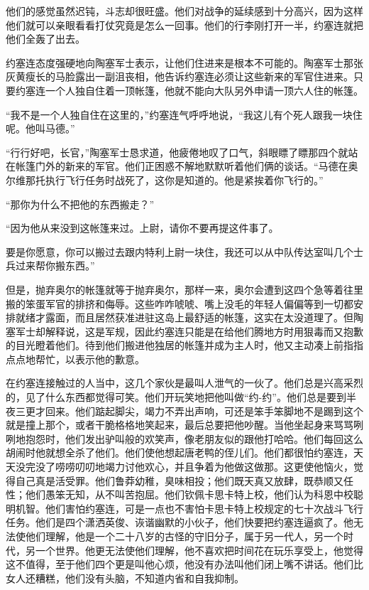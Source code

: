  


    他们的感觉虽然迟钝，斗志却很旺盛。他们对战争的延续感到十分高兴，因为这样他们就可以亲眼看看打仗究竟是怎么一回事。他们的行李刚打开一半，约塞连就把他们全轰了出去。

    约塞连态度强硬地向陶塞军士表示，让他们住进来是根本不可能的。陶塞军士那张灰黄瘦长的马脸露出一副沮丧相，他告诉约塞连必须让这些新来的军官住进来。只要约塞连一个人独自住着一顶帐篷，他就不能向大队另外申请一顶六人住的帐篷。

    “我不是一个人独自住在这里的，”约塞连气呼呼地说，“我这儿有个死人跟我一块住呢。他叫马德。”

    “行行好吧，长官，”陶塞军士恳求道，他疲倦地叹了口气，斜眼瞟了瞟那四个就站在帐篷门外的新来的军官。他们正困惑不解地默默听着他们俩的谈话。“马德在奥尔维那托执行飞行任务时战死了，这你是知道的。他是紧挨着你飞行的。”

    “那你为什么不把他的东西搬走？”

    “因为他从来没到这帐篷来过。上尉，请你不要再提这件事了。

    要是你愿意，你可以搬过去跟内特利上尉一块住，我还可以从中队传达室叫几个士兵过来帮你搬东西。”

    但是，抛弃奥尔的帐篷就等于抛弃奥尔，那样一来，奥尔会遭到这四个急等着往里搬的笨蛋军官的排挤和侮辱。这些咋咋唬唬、嘴上没毛的年轻人偏偏等到一切都安排就绪才露面，而且居然获准进驻这岛上最舒适的帐篷，这实在太没道理了。但陶塞军士却解释说，这是军规，因此约塞连只能是在给他们腾地方时用狠毒而又抱歉的目光瞪着他们。待到他们搬进他独居的帐篷并成为主人时，他又主动凑上前指指点点地帮忙，以表示他的歉意。

    在约塞连接触过的人当中，这几个家伙是最叫人泄气的一伙了。他们总是兴高采烈的，见了什么东西都觉得可笑。他们开玩笑地把他叫做“约-约”。他们总是要到半夜三更才回来。他们踮起脚尖，竭力不弄出声响，可还是笨手笨脚地不是踢到这个就是撞上那个，或者干脆格格地笑起来，最后总要把他吵醒。当他坐起身来骂骂咧咧地抱怨时，他们发出驴叫般的欢笑声，像老朋友似的跟他打哈哈。他们每回这么胡闹时他就想全杀了他们。他们使他想起唐老鸭的侄儿们。他们都很怕约塞连，天天没完没了唠唠叨叨地竭力讨他欢心，并且争着为他做这做那。这更使他恼火，觉得自己真是活受罪。他们鲁莽幼稚，臭味相投；他们既天真又放肆，既恭顺又任性；他们愚笨无知，从不叫苦抱屈。他们钦佩卡思卡特上校，他们认为科恩中校聪明机智。他们害怕约塞连，可是一点也不害怕卡思卡特上校规定的七十次战斗飞行任务。他们是四个潇洒英俊、诙谐幽默的小伙子，他们快要把约塞连逼疯了。他无法使他们理解，他是一个二十八岁的古怪的守旧分子，属于另一代人，另一个时代，另一个世界。他更无法使他们理解，他不喜欢把时间花在玩乐享受上，他觉得这不值得，至于他们四个更是叫他心烦，他没有办法叫他们闭上嘴不讲话。他们比女人还糟糕，他们没有头脑，不知道内省和自我抑制。

